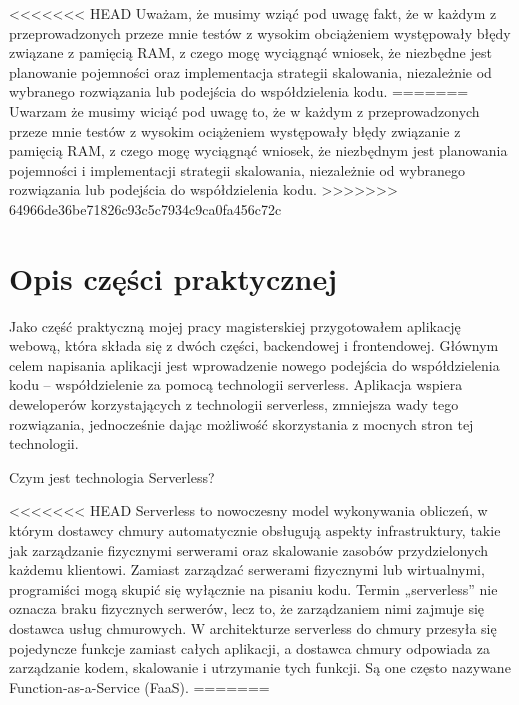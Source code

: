 \documentclass[runningheads,12pt]{llncs}
\begin{document}
<<<<<<< HEAD
Uważam, że musimy wziąć pod uwagę fakt, że w każdym z przeprowadzonych przeze mnie testów z wysokim obciążeniem występowały błędy związane z pamięcią RAM, z czego mogę wyciągnąć wniosek, że niezbędne jest planowanie pojemności oraz implementacja strategii skalowania, niezależnie od wybranego rozwiązania lub podejścia do współdzielenia kodu.
=======
Uwarzam że musimy wiciąć pod uwagę to, że w każdym z przeprowadzonych przeze mnie testów z wysokim ociążeniem występowały błędy związanie z pamięcią RAM, z czego mogę wyciągnąć wniosek, że niezbędnym jest  planowania pojemności i implementacji strategii skalowania, niezależnie od wybranego rozwiązania lub podejścia do współdzielenia kodu.
>>>>>>> 64966de36be71826c93c5c7934c9ca0fa456c72c


\section{Opis części praktycznej}


Jako część praktyczną mojej pracy magisterskiej przygotowałem aplikację webową, która składa się z dwóch części, backendowej i frontendowej.
Głównym celem napisania aplikacji jest wprowadzenie nowego podejścia do współdzielenia kodu – współdzielenie za pomocą technologii serverless. Aplikacja wspiera deweloperów korzystających z technologii serverless, zmniejsza wady tego rozwiązania, jednocześnie dając możliwość skorzystania z mocnych stron tej technologii.

Czym jest technologia Serverless?

<<<<<<< HEAD
Serverless to nowoczesny model wykonywania obliczeń, w którym dostawcy chmury automatycznie obsługują aspekty infrastruktury, takie jak zarządzanie fizycznymi serwerami oraz skalowanie zasobów przydzielonych każdemu klientowi. Zamiast zarządzać serwerami fizycznymi lub wirtualnymi, programiści mogą skupić się wyłącznie na pisaniu kodu. Termin „serverless” nie oznacza braku fizycznych serwerów, lecz to, że zarządzaniem nimi zajmuje się dostawca usług chmurowych. W architekturze serverless do chmury przesyła się pojedyncze funkcje zamiast całych aplikacji, a dostawca chmury odpowiada za zarządzanie kodem, skalowanie i utrzymanie tych funkcji. Są one często nazywane Function-as-a-Service (FaaS).
=======
\end{document}
